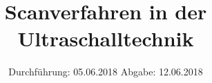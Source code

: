 
\setlength{\parindent}{0 pt}

\subject{US2}
\title{Scanverfahren in der Ultraschalltechnik}
\date{%
  Durchführung: 05.06.2018
  \hspace{3em}
  Abgabe: 12.06.2018
}



\maketitle
\thispagestyle{empty}
\tableofcontents
\newpage






\printbibliography{}


